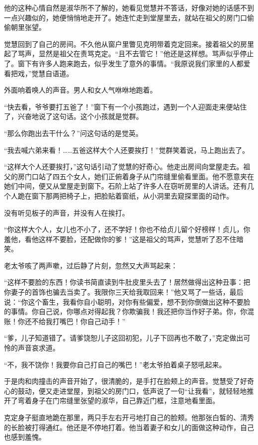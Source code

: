 \par 他的这种心情自然是淑华所不了解的，她看见觉慧并不答话，好像对她的话感不到一点兴趣似的，她便悄悄地走开了。她连忙走到堂屋里去，就站在祖父的房门口偷偷朝里张望。
\par 觉慧回到了自己的房间。不久他从窗户里瞥见克明带着克定回来。接着祖父的房里起了骂声，显然是祖父在责骂克定。“且不去管它！”他还是这样想。骂声似乎停止了。窗下有许多人跑来跑去，似乎发生了意外的事情。“我原说我们家里的人都爱看把戏，”觉慧自语道。
\par 外面响着唤人的声音。男人和女人气咻咻地跑着。
\par “快去看，爷爷要打五爸了！”窗下有一个小孩跑过，遇到一个人迎面走来便站住了，兴奋地说了这句话。这个小孩就是觉群。
\par “那么你跑出去干什么？”问这句话的是觉英。
\par “我去喊六弟来看！……五爸这样大个人还要挨打！”觉群笑着说，马上跑出去了。
\par “这样大个人还要挨打，”这句话引动了觉慧的好奇心。他走出房间向堂屋走去。祖父的房门口站了四五个女人，她们正俯着身子从门帘缝里偷看里面。他不愿意夹在她们中间，便又从堂屋走到窗下。石阶上站了许多人在窃听房里的人讲话。还有几个人跪在窗下那两把椅子上，把脸贴着窗纸，从小洞里去窥探里面的动作。
\par 没有听见板子的声音，并没有人在挨打。
\par “你这样大个人，女儿也不小了，还不学好！你也不给贞儿留个好榜样！贞儿，你羞他，看他这样不要脸，还配做你的爹！”这是祖父的骂声，觉慧听了忍不住暗笑。
\par 老太爷咳了两声嗽，过后静了片刻，忽然又大声骂起来：
\par “这样不要脸的东西！你读书简直读到牛肚皮里头去了！居然做得出这种丑事：把你妻子的首饰也骗去当卖了。我限你三天给我取回来！”他又骂了一些话，最后说：“你这个畜生，我看你自小聪明，对你有些偏爱，想不到你倒做出这种不要脸的事情。你自己说，你哪点对得起我？你欺骗我！我还把你当作好子弟。你，你混账！你还不给我打嘴巴！你自己动手！”
\par “爹，儿子知道错了。请爹饶恕儿子这回初犯，儿子下回再也不敢了，”克定做出可怜的声音哀求道。
\par “不，我不饶你！我要你自己打自己的嘴巴！”老太爷拍着桌子怒吼起来。
\par 于是肉和肉撞击的声音开始了，很清脆的，是手打在脸颊上的声音。觉慧受了好奇心的鼓动，便又走进堂屋，到祖父的房门口，低声说了一句“让我看”，就轻轻地推开了弯着身子在门帘缝里张望的淑华，自己靠近门框，注意地看里面。
\par 克定身子挺直地跪在那里，两只手左右开弓地打自己的脸颊。他那张白皙的、清秀的长脸被打得通红。他还是不停地打着。他当着妻子和女儿的面做这种动作，自己也感到羞愧。
